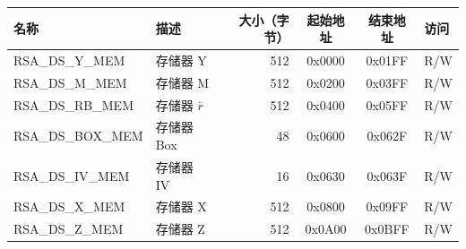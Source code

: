 \begin{longtable}{ | l | l | r | c | c | l | }
\hline
\rowcolor{lightgray}
\textbf{名称} & \textbf{描述}  &  \textbf{大小（字节）}  &  \textbf{起始地址}  &  \textbf{结束地址}  & \textbf{访问}   \\ \hline
RSA\_DS\_Y\_MEM\label{RSADSYMEM} & 存储器 Y  & 512  & 0x0000 & 0x01FF & R/W \\ \hline
RSA\_DS\_M\_MEM\label{RSADSMMEM} & 存储器 M & 512  & 0x0200 & 0x03FF & R/W \\ \hline
RSA\_DS\_RB\_MEM\label{RSADSRBMEM} & 存储器 $\overline{r}$  & 512  & 0x0400 & 0x05FF & R/W \\ \hline
RSA\_DS\_BOX\_MEM\label{RSADSBOXMEM} & 存储器 Box  & 48  & 0x0600 & 0x062F & R/W \\ \hline
RSA\_DS\_IV\_MEM\label{RSADSIVMEM} & 存储器 IV  & 16  & 0x0630 & 0x063F & R/W \\ \hline
RSA\_DS\_X\_MEM\label{RSADSXMEM} & 存储器 X  & 512  & 0x0800 & 0x09FF & R/W \\ \hline
RSA\_DS\_Z\_MEM\label{RSADSZMEM} & 存储器 Z  & 512  & 0x0A00 & 0x0BFF & R/W \\ \hline
\end{longtable}
